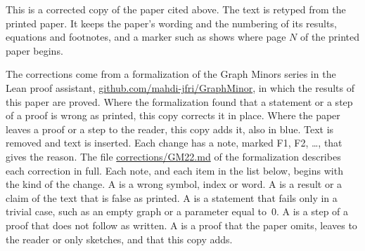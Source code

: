 
This is a corrected copy of the paper cited above. The text is retyped from the printed paper.
It keeps the paper's wording and the numbering of its results, equations and footnotes, and a
marker such as  shows where page $N$ of the printed paper begins.

The corrections come from a formalization of the Graph Minors series in the Lean proof
assistant, \href{https://github.com/mahdi-jfri/GraphMinor}{github.com/mahdi-jfri/GraphMinor},
in which the results of this paper are proved. Where the formalization found that a statement
or a step of a proof is wrong as printed, this copy corrects it in place. Where the paper leaves a proof or a step to the reader, this
copy adds it, also in blue. Text  is removed and text  is inserted. Each change has a note, marked
\textcolor{fixcolor}{\sffamily F1}, \textcolor{fixcolor}{\sffamily F2}, \dots, that gives the
reason. The file
\href{https://github.com/mahdi-jfri/GraphMinor/blob/main/corrections/GM22.md}{corrections/GM22.md}
of the formalization describes each correction in full. Each note, and each item in the list below, begins with the kind of the change. A  is a wrong symbol, index or word. A  is a result or a claim of the text that is false as printed. A  is a statement that fails only in a trivial case, such as an empty graph or a parameter equal to~$0$. A  is a step of a proof that does not follow as written. A  is a proof that the paper omits, leaves to the reader or only sketches, and that this copy adds.

